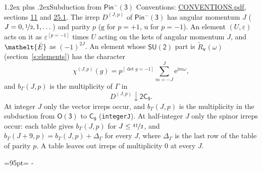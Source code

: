 \documentclass[10pt,a4paper]{article}
\makeatletter
\renewcommand\section{\@startsection{section}{1}{\z@}{-3ex plus -1ex minus -.2ex}%
  {1.2ex plus .2ex}{\normalfont\large\sffamily\bfseries\color{parttitle}}}
\newcommand{\needspace}[1]{\par\penalty-100\begingroup\dimen0=#1\relax\dimen2=\pagegoal
  \advance\dimen2-\pagetotal\ifdim\dimen0>\dimen2\relax\ifdim\dimen2>0pt\vfil\break\fi\fi
  \endgroup}
\numberwithin{equation}{section}
\newcommand{\eltfont}[1]{{\let\sigma\eltsigma\mathelt{#1}}}
\newcommand{\grp}[1]{\mathsf{#1}}
\newcommand{\elt}[1]{\eltfont{#1}}
\newcommand{\ptag}[1]{\mathrm{#1}}
\newcommand{\iverson}[1]{[#1]}
\newcommand{\restr}[2]{#1\!\downarrow#2}
\newcommand{\vv}{\mathbf{v}}
\newcommand{\iunit}{\mathrm{i}}
\newcommand{\expe}{\mathrm{e}}
\newcommand{\irrJp}[2]{D^{(#1,#2)}}
\newcommand{\barred}[1]{\bar{#1}}
\newcommand{\lift}[1]{\tilde{#1}}
\makeatother
\begin{document}
\section{Subduction from \texorpdfstring{$\grp{Pin^{-}(3)}$}{Pin(3)}}\label{s:subduction_parent}
Conventions: \href{../../CONVENTIONS.pdf}{CONVENTIONS.pdf}, sections \href{../../../rotation/CONVENTIONS.pdf\#conv.11}{11} and \href{../../CONVENTIONS.pdf\#conv.25.1}{25.1}.
\leavevmode\label{n:index.J}\label{n:index.parity}\label{n:irrep.o3}The irrep $\irrJp{J}{p}$ of \href{Pinminus3.pdf}{$\grp{Pin^{-}(3)}$} has angular momentum $J$ ($J = 0, \nicefrac{1}{2}, 1, \dots$) and parity $p$ ($\ptag{g}$ for $p = +1$, $\ptag{u}$ for $p = -1$). An element $(U, \varepsilon)$ acts on it as $\varepsilon^{[p = -1]}$ times $U$ acting on the kets of angular momentum $J$, and $\elt{\barred{E}}$ as $(-1)^{2J}$. \label{n:function.character.parent}\label{n:function.multiplicity}An element whose $\grp{SU(2)}$ part is $\lift{R}_{\vv}(\omega)$ (section~\ref{s:elements}) has the character
\begin{equation}\label{e:chi}\chi^{(J,p)}(g) = p^{\iverson{\det g = -1}}\sum_{m=-J}^{J} \expe^{\iunit m\omega},\end{equation}
and $b_\Gamma(J, p)$ is the multiplicity of $\Gamma$ in
\begin{equation}\label{e:parent}\restr{\irrJp{J}{p}}{\grp{2C_{9}}}.\end{equation}
At integer $J$ only the vector irreps occur, and $b_\Gamma(J, p)$ is the multiplicity in the subduction from $\grp{O(3)}$ to \href{../../../rotation/data/pdf/C9.pdf}{$\grp{C_{9}}$} (\texttt{integerJ}). \label{n:index.increment}At half-integer $J$ only the spinor irreps occur: each table gives $b_\Gamma(J, p)$ for $J \le \nicefrac{41}{2}$, and $b_\Gamma(J + 9, p) = b_\Gamma(J, p) + \Delta_\Gamma$ for every $J$, where $\Delta_\Gamma$ is the last row of the table of parity $p$. A table leaves out irreps of multiplicity 0 at every $J$.
\needspace{95pt}
\end{document}
